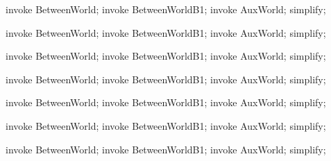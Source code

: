 \begin{LPScript}\begin{zproof}[lBetweenWorldFromLoggedExpansion]
    invoke BetweenWorld;
    invoke BetweenWorldB1;
    invoke AuxWorld;
    simplify;
\end{zproof}\end{LPScript}

\begin{LPScript}\begin{zproof}[lBetweenWorldToLoggedExpansion]
    invoke BetweenWorld;
    invoke BetweenWorldB1;
    invoke AuxWorld;
    simplify;
\end{zproof}\end{LPScript}

\begin{LPScript}\begin{zproof}[lBetweenWorldAuthenticFromExpansion]
    invoke BetweenWorld;
    invoke BetweenWorldB1;
    invoke AuxWorld;
    simplify;
\end{zproof}\end{LPScript}

\begin{LPScript}\begin{zproof}[lBetweenWorldAuthenticToExpansion]
    invoke BetweenWorld;
    invoke BetweenWorldB1;
    invoke AuxWorld;
    simplify;
\end{zproof}\end{LPScript}

\begin{LPScript}\begin{zproof}[lBetweenWorldToInEpvExpansion]
    invoke BetweenWorld;
    invoke BetweenWorldB1;
    invoke AuxWorld;
    simplify;
\end{zproof}\end{LPScript}

\begin{LPScript}\begin{zproof}[lBetweenWorldToInEapayeeExpansion]
    invoke BetweenWorld;
    invoke BetweenWorldB1;
    invoke AuxWorld;
    simplify;
\end{zproof}\end{LPScript}

\begin{LPScript}\begin{zproof}[lBetweenWorldFromInEprExpansion]
    invoke BetweenWorld;
    invoke BetweenWorldB1;
    invoke AuxWorld;
    simplify;
\end{zproof}\end{LPScript}

